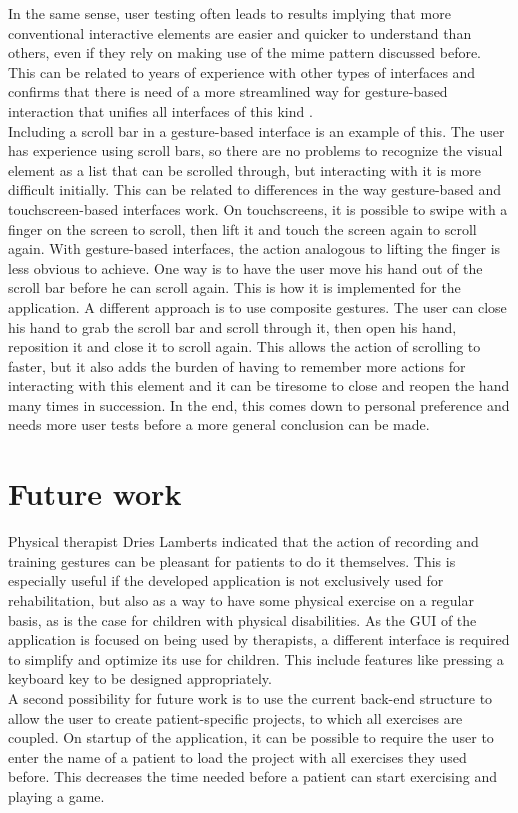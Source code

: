 In the same sense, user testing often leads to results implying that more conventional interactive elements are easier and quicker to understand than others, even if they rely on making use of the mime pattern discussed before. This can be related to years of experience with other types of interfaces and confirms that there is need of a more streamlined way for gesture-based interaction that unifies all interfaces of this kind \cite{Norman2010}.\\

Including a scroll bar in a gesture-based interface is an example of this. The user has experience using scroll bars, so there are no problems to recognize the visual element as a list that can be scrolled through, but interacting with it is more difficult initially. This can be related to differences in the way gesture-based and touchscreen-based interfaces work. On touchscreens, it is possible to swipe with a finger on the screen to scroll, then lift it and touch the screen again to scroll again. With gesture-based interfaces, the action analogous to lifting the finger is less obvious to achieve. One way is to have the user move his hand out of the scroll bar before he can scroll again. This is how it is implemented for the application. A different approach is to use composite gestures. The user can close his hand to grab the scroll bar and scroll through it, then open his hand, reposition it and close it to scroll again. This allows the action of scrolling to faster, but it also adds the burden of having to remember more actions for interacting with this element and it can be tiresome to close and reopen the hand many times in succession. In the end, this comes down to personal preference and needs more user tests before a more general conclusion can be made.\\


\section{Future work}

Physical therapist Dries Lamberts indicated that the action of recording and training gestures can be pleasant for patients to do it themselves. This is especially useful if the developed application is not exclusively used for rehabilitation, but also as a way to have some physical exercise on a regular basis, as is the case for children with physical disabilities. As the GUI of the application is focused on being used by therapists, a different interface is required to simplify and optimize its use for children. This include features like pressing a keyboard key to be designed appropriately.\\

A second possibility for future work is to use the current back-end structure to allow the user to create patient-specific projects, to which all exercises are coupled. On startup of the application, it can be possible to require the user to enter the name of a patient to load the project with all exercises they used before. This decreases the time needed before a patient can start exercising and playing a game.
